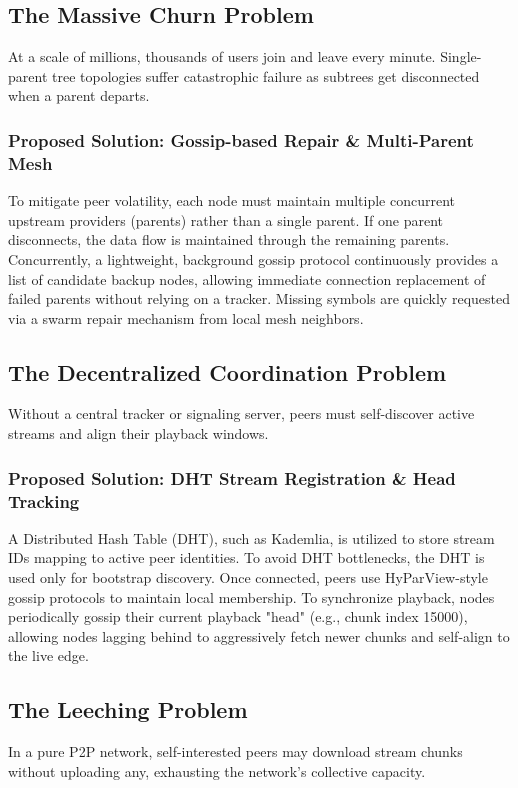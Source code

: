 \documentclass[journal]{IEEEtran}
\begin{document}
\subsection{The Massive Churn Problem}
At a scale of millions, thousands of users join and leave every minute. Single-parent tree topologies suffer catastrophic failure as subtrees get disconnected when a parent departs.

\subsubsection{Proposed Solution: Gossip-based Repair \& Multi-Parent Mesh}
To mitigate peer volatility, each node must maintain multiple concurrent upstream providers (parents) rather than a single parent. If one parent disconnects, the data flow is maintained through the remaining parents. Concurrently, a lightweight, background gossip protocol continuously provides a list of candidate backup nodes, allowing immediate connection replacement of failed parents without relying on a tracker. Missing symbols are quickly requested via a swarm repair mechanism from local mesh neighbors.

\subsection{The Decentralized Coordination Problem}
Without a central tracker or signaling server, peers must self-discover active streams and align their playback windows.

\subsubsection{Proposed Solution: DHT Stream Registration \& Head Tracking}
A Distributed Hash Table (DHT), such as Kademlia, is utilized to store stream IDs mapping to active peer identities. To avoid DHT bottlenecks, the DHT is used only for bootstrap discovery. Once connected, peers use HyParView-style gossip protocols to maintain local membership. To synchronize playback, nodes periodically gossip their current playback "head" (e.g., chunk index 15000), allowing nodes lagging behind to aggressively fetch newer chunks and self-align to the live edge.

\subsection{The Leeching Problem}
In a pure P2P network, self-interested peers may download stream chunks without uploading any, exhausting the network's collective capacity.
\end{document}
